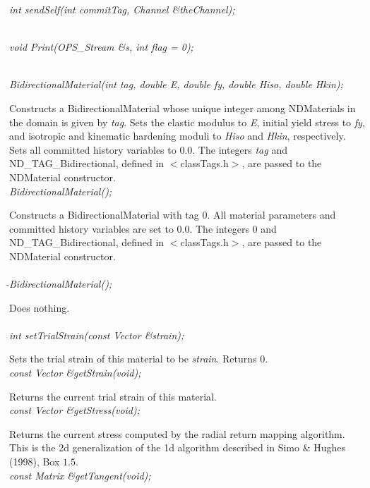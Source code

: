 {\em int sendSelf(int commitTag, Channel \&theChannel); } 

 \\
{\em void Print(OPS_Stream \&s, int flag = 0);} 


 \\
{\em BidirectionalMaterial(int tag, double E, double fy, double Hiso, double Hkin);} 

Constructs a BidirectionalMaterial whose unique integer among
NDMaterials in the domain is given by {\em tag}.
Sets the elastic modulus to {\em E}, initial yield stress
to {\em fy}, and isotropic and kinematic hardening moduli to 
{\em Hiso} and {\em Hkin}, respectively. Sets all committed history
variables to $0.0$. The integers {\em tag} and ND\_TAG\_Bidirectional, 
defined in $<$classTags.h$>$, are passed to the NDMaterial 
constructor. \\ 

{\em BidirectionalMaterial();} 

Constructs a BidirectionalMaterial with tag 0. All material parameters
and committed history variables are set to $0.0$. The integers 0 and 
ND\_TAG\_Bidirectional, defined in $<$classTags.h$>$, are passed to 
the NDMaterial constructor. \\ 

 \\
{\em $\tilde{ }$BidirectionalMaterial();} 

Does nothing. \\

 \\
{\em int setTrialStrain(const Vector \&strain); } 

Sets the trial strain of this material to be {\em strain}. Returns 0. \\

{\em const Vector \&getStrain(void); } 

Returns the current trial strain of this material. \\

{\em const Vector \&getStress(void); } 

Returns the current stress computed by the radial return mapping algorithm. This
is the 2d generalization of the 1d algorithm described in Simo \& Hughes (1998),
Box $1.5$. \\

{\em const Matrix \&getTangent(void); } 

